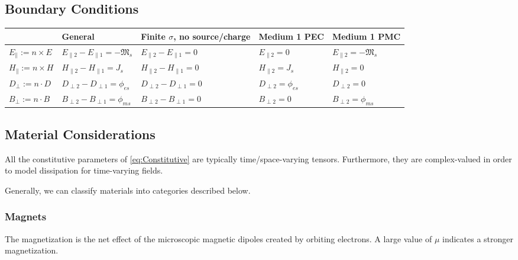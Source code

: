 \documentclass{article}
\numberwithin{equation}{section}
\begin{document}
        \subsection{Boundary Conditions}
            \scriptsize
            \begin{tabular}{ | m{6.5em} || m{7.9em} | m{7.5em} | m{7.7em} | m{7.9em} | }
                \hline
                    & \textbf{General} & \textbf{Finite \( \sigma \), no source/charge} &
                    \textbf{Medium 1 PEC} & \textbf{Medium 1 PMC} \\
                \hline\hline
                    \( E_{\parallel} := n \times E \) & \( E_{\parallel 2} -
                    E_{\parallel 1} = -\mathfrak{M}_s \) & \( E_{\parallel 2} -
                    E_{\parallel 1} = 0 \) & \(E_{\parallel 2} = 0 \) & \( E_{\parallel
                    2} = -\mathfrak{M}_s \) \\
                \( H_{\parallel} := n \times H \) & \( H_{\parallel 2} - H_{\parallel 1} =
                    J_s \) & \( H_{\parallel 2} - H_{\parallel 1} = 0 \) & \( H_{\parallel
                    2} = J_s \) & \( H_{\parallel 2} = 0 \) \\
                \( D_{\perp} := n \cdot D \) & \( D_{\perp 2} - D_{\perp 1} = \phi_{es}
                    \) & \( D_{\perp 2} - D_{\perp 1} = 0 \) & \( D_{\perp 2} =
                    \phi_{es} \) & \( D_{\perp 2} = 0 \) \\
                \( B_{\perp} := n \cdot B \) & \( B_{\perp 2} - B_{\perp 1} = \phi_{ms}
                    \) & \( B_{\perp 2} - B_{\perp 1} = 0 \) & \( B_{\perp 2} = 0 \) & \(
                    B_{\perp 2} = \phi_{ms} \) \\
                \hline
            \end{tabular}
            \normalsize
        \subsection{Material Considerations}
            All the constitutive parameters of \eqref{eq:Constitutive} are typically
            time/space-varying tensors. Furthermore, they are complex-valued in order to
            model dissipation for time-varying fields.

            Generally, we can classify materials into categories described below.
        \subsubsection{Magnets}
        The magnetization is the net effect of the microscopic
        magnetic dipoles created by orbiting electrons. A large value of $\mu$
        indicates a stronger magnetization.
\end{document}
